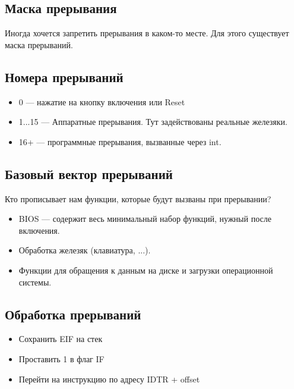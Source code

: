 \begin{multicols}{2}
      \subsection*{Маска прерывания}
      
      Иногда хочется запретить прерывания в каком-то месте. Для этого существует маска прерываний.
      
      \subsection*{Номера прерываний}
      
      \begin{itemize}
        \item 0 --- нажатие на кнопку включения или Reset
        \item 1...15 --- Аппаратные прерывания. Тут задействованы реальные железяки.
        \item 16+ --- программные прерывания, вызванные через int.
      \end{itemize}
      
      \subsection*{Базовый вектор прерываний}
      
      Кто прописывает нам функции, которые будут вызваны при прерывании?
      \begin{itemize}
        \item BIOS --- содержит весь минимальный набор функций, нужный после включения.
        \item Обработка железяк (клавиатура, ...).
        \item Функции для обращения к данным на диске и загрузки операционной системы.
      \end{itemize}
      
      \subsection*{Обработка прерываний}
      
      \begin{itemize}
        \item Сохранить EIF на стек
        \item Проставить 1 в флаг IF
        \item Перейти на инструкцию по адресу IDTR + offset
      \end{itemize}
      

\end{multicols}
